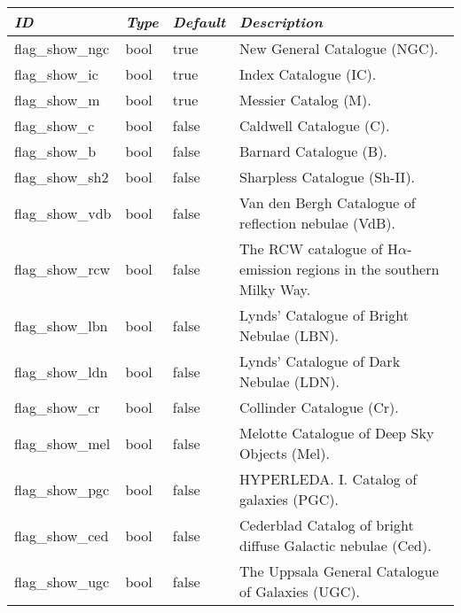 \begin{longtabu} to \textwidth {l|l|l|X}\toprule
\emph{ID} & \emph{Type} & \emph{Default} & \emph{Description}\\\midrule
flag\_show\_ngc & bool & true  & New General Catalogue (NGC). \\\midrule
flag\_show\_ic  & bool & true  & Index Catalogue (IC). \\\midrule
flag\_show\_m   & bool & true  & Messier Catalog (M). \\\midrule
flag\_show\_c   & bool & false & Caldwell Catalogue (C). \\\midrule
flag\_show\_b   & bool & false & Barnard Catalogue (B). \\\midrule
flag\_show\_sh2 & bool & false & Sharpless Catalogue (Sh-II). \\\midrule
flag\_show\_vdb & bool & false & Van den Bergh Catalogue of reflection nebulae (VdB). \\\midrule
flag\_show\_rcw & bool & false & The RCW catalogue of H$\alpha$-emission regions in the southern Milky Way. \\\midrule
flag\_show\_lbn & bool & false & Lynds' Catalogue of Bright Nebulae (LBN). \\\midrule
flag\_show\_ldn & bool & false & Lynds' Catalogue of Dark Nebulae (LDN). \\\midrule
flag\_show\_cr  & bool & false & Collinder Catalogue (Cr). \\\midrule
flag\_show\_mel & bool & false & Melotte Catalogue of Deep Sky Objects (Mel).  \\\midrule
flag\_show\_pgc & bool & false & HYPERLEDA. I. Catalog of galaxies (PGC). \\\midrule
flag\_show\_ced & bool & false & Cederblad Catalog of bright diffuse Galactic nebulae (Ced). \\\midrule
flag\_show\_ugc & bool & false & The Uppsala General Catalogue of Galaxies (UGC). \\\bottomrule
\end{longtabu}

\section{}
\label{sec:config.ini:dso_type_filters}

